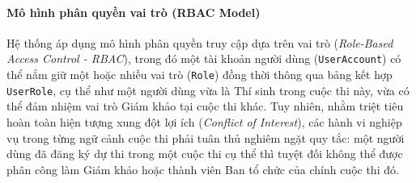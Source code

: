 \paragraph{Mô hình phân quyền vai trò (RBAC Model)}
Hệ thống áp dụng mô hình phân quyền truy cập dựa trên vai trò (\textit{Role-Based Access Control - RBAC}), trong đó một tài khoản người dùng (\texttt{UserAccount}) có thể nắm giữ một hoặc nhiều vai trò (\texttt{Role}) đồng thời thông qua bảng kết hợp \texttt{UserRole}, cụ thể như một người dùng vừa là Thí sinh trong cuộc thi này, vừa có thể đảm nhiệm vai trò Giám khảo tại cuộc thi khác. Tuy nhiên, nhằm triệt tiêu hoàn toàn hiện tượng xung đột lợi ích (\textit{Conflict of Interest}), các hành vi nghiệp vụ trong từng ngữ cảnh cuộc thi phải tuân thủ nghiêm ngặt quy tắc: một người dùng đã đăng ký dự thi trong một cuộc thi cụ thể thì tuyệt đối không thể được phân công làm Giám khảo hoặc thành viên Ban tổ chức của chính cuộc thi đó.
